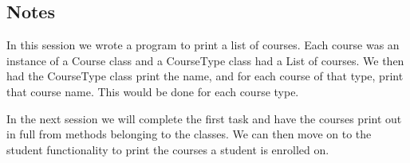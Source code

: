 \documentclass{article}
\begin{document}
\subsection{Notes}
In this session we wrote a program to print a list of courses. Each course was an instance of a Course class and a CourseType class had a List of courses. We then had the CourseType class print the name, and for each course of that type, print that course name. This would be done for each course type.

In the next session we will complete the first task and have the courses print out in full from methods belonging to the classes. We can then move on to the student functionality to print the courses a student is enrolled on.
\end{document}
